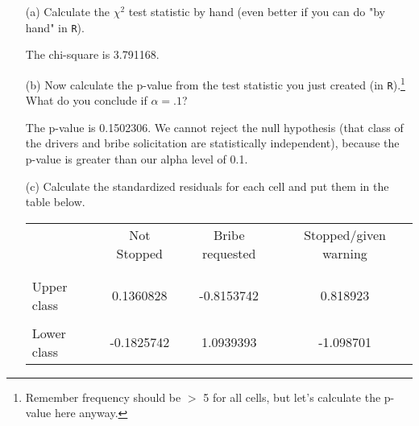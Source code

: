 \documentclass[12pt,letterpaper]{article}
\begin{document}
\begin{enumerate}
	
	\item [(a)]
	Calculate the $\chi^2$ test statistic by hand (even better if you can do "by hand" in \texttt{R}).\\
	\vspace{.2cm}



The chi-square is 3.791168.
	\vspace{1cm}

	\item [(b)]
	Now calculate the p-value from the test statistic you just created (in \texttt{R}).\footnote{Remember frequency should be $>$ 5 for all cells, but let's calculate the p-value here anyway.}  What do you conclude if $\alpha = .1$?\\
	\vspace{.2cm}
		


The p-value is 0.1502306. We cannot reject the null hypothesis (that class of the drivers and bribe solicitation are statistically independent), because the p-value is greater than our alpha level of 0.1.
	\vspace{1cm}
	
	\item [(c)] Calculate the standardized residuals for each cell and put them in the table below.
	\vspace{.2cm}



	\begin{table}[h]
		\centering
		\begin{tabular}{l | c c c }
			& Not Stopped & Bribe requested & Stopped/given warning \\
			\\[-1.8ex] 
			\hline \\[-1.8ex]
			Upper class & 0.1360828 & -0.8153742 & 0.818923 \\
			\\
			Lower class & -0.1825742 & 1.0939393 & -1.098701 \\
			
		\end{tabular}
	\end{table}
	\vspace{.2cm}


\end{enumerate}
\end{document}
